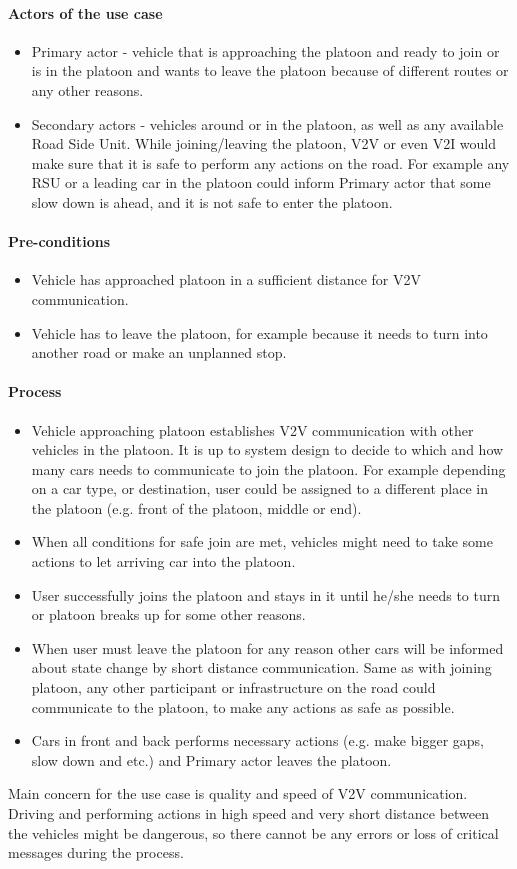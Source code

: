 \paragraph{Actors of the use case}
\begin{itemize}[noitemsep]
    \item Primary actor - vehicle that is approaching the platoon and ready to join or is in the platoon and wants to leave the platoon because of different routes or any other reasons.
    \item Secondary actors - vehicles around or in the platoon, as well as any available Road Side Unit. While joining/leaving the platoon, V2V or even V2I would make sure that it is safe to perform any actions on the road. For example any RSU or a leading car in the platoon could inform Primary actor that some slow down is ahead, and it is not safe to enter the platoon.
\end{itemize}
% 
\paragraph{Pre-conditions}
\begin{itemize}[noitemsep]
    \item Vehicle has approached platoon in a sufficient distance for V2V communication.
    \item Vehicle has to leave the platoon, for example because it needs to turn into another road or make an unplanned stop.
\end{itemize}
% 
\paragraph{Process}
\begin{itemize}[noitemsep]
    \item Vehicle approaching platoon establishes V2V communication with other vehicles in the platoon. It is up to system design to decide to which and how many cars needs to communicate to join the platoon. For example depending on a car type, or destination, user could be assigned to a different place in the platoon (e.g. front of the platoon, middle or end).
    \item When all conditions for safe join are met, vehicles might need to take some actions to let arriving car into the platoon.
    \item User successfully joins the platoon and stays in it until he/she needs to turn or platoon breaks up for some other reasons.
    \item When user must leave the platoon for any reason other cars will be informed about state change by short distance communication. Same as with joining platoon, any other participant or infrastructure on the road could communicate to the platoon, to make any actions as safe as possible.
    \item Cars in front and back performs necessary actions (e.g. make bigger gaps, slow down and etc.) and Primary actor leaves the platoon.
\end{itemize}
% 
Main concern for the use case is quality and speed of V2V communication. Driving and performing actions in high speed and very short distance between the vehicles might be dangerous, so there cannot be any errors or loss of critical messages during the process.